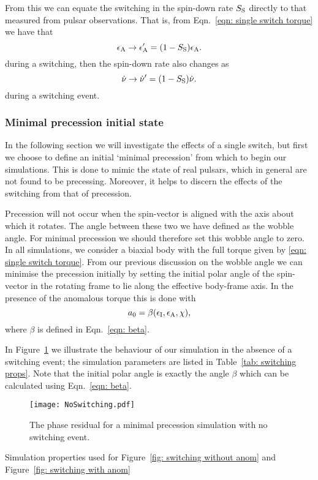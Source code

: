 \documentclass[../full_thesis/full_thesis.tex]{subfiles}
\newcommand{\thisdir}{../inertial_frame}
\begin{document}
From this we can equate the switching in the spin-down rate $S_{\mathrm{S}}$ directly to
that measured from pulsar observations. That is, from Eqn.~\eqref{eqn: single switch torque}
we have that
\begin{equation}
    \epsilon_{\mathrm{A}} \rightarrow \epsilon_{\mathrm{A}}' = (1-S_{\mathrm{S}})\epsilon_{\mathrm{A}}.
\label{eqn: epsA switch}
\end{equation}
during a switching, then the spin-down rate also changes as
\begin{equation}
    \dot{\nu} \rightarrow \dot{\nu}' = (1-S_{\mathrm{S}})\dot{\nu}.
\label{eqn: nudot switch}
\end{equation}
during a switching event.

\subsubsection{Minimal precession initial state}
In the following section we will investigate the effects of a single switch, but
first we choose to define an initial `minimal precession' from which to begin
our simulations. This is done to mimic the state of real pulsars, which in
general are not found to be precessing. Moreover, it helps to discern the
effects of the switching from that of precession.

Precession will not occur when the spin-vector is aligned with the axis about
which it rotates. The angle between these two we have defined as the wobble
angle.  For minimal precession we should therefore set this wobble angle to
zero. In all simulations, we consider a biaxial body with the full torque given
by \eqref{eqn: single switch torque}. From our previous discussion on the
wobble angle we can minimise the precession initially by setting the initial polar angle
of the spin-vector in the rotating frame to lie along the effective body-frame
axis. In the presence of the anomalous torque this is done with
\begin{equation}
a_{0} = \beta(\epsilon_{\mathrm{I}}, \epsilon_{\mathrm{A}}, \chi),
\end{equation}
where $\beta$ is defined in Eqn.~\ref{eqn: beta}.

In Figure~\ref{fig: no switching} we illustrate the behaviour of our simulation
in the absence of a switching event; the simulation parameters are listed in
Table~\ref{tab: switching props}. Note that the initial polar angle is
exactly the angle $\beta$ which can be calculated using Eqn.~\eqref{eqn: beta}.
\begin{figure}[htb]
\texttt{[image: NoSwitching.pdf]}
\caption{The phase residual for a minimal precession simulation with no
         switching event.}
\label{fig: no switching}
\end{figure}
\begin{table}[htb]
\centering

\caption{Simulation properties used for Figure~\ref{fig: switching without anom}
and Figure~\ref{fig: switching with anom}}
\label{tab: switching props}
\end{table}
\end{document}
